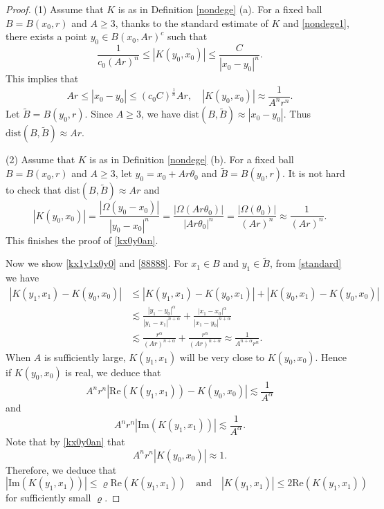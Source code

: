 \documentclass[oneside,english,a4wide]{amsart}
\numberwithin{equation}{section}
\numberwithin{figure}{section}
\theoremstyle{plain}
\theoremstyle{plain}
\theoremstyle{definition}
\theoremstyle{plain}
\theoremstyle{remark}
\theoremstyle{definition}
\theoremstyle{remark}
\theoremstyle{definition}
\newcommand{\8}{\infty}
\begin{document}
\begin{proof}
	(1) Assume that $K$ is as in Definition \ref{nondege} (a). For a fixed ball $B=B(x_0,r)$ and $A\ge 3$, thanks to the standard estimate of $K$ and \eqref{nondege1}, there exists a point $y_0\in B(x_0,Ar)^c$ such that
	\begin{equation*}
		\frac{1}{c_0(Ar)^n}\le |K(y_0,x_0)|\le \frac{C}{|x_0-y_0|^n}.
	\end{equation*}
	This implies that 
	\begin{equation*}
		Ar\le |x_0-y_0|\le (c_0C)^{\frac{1}{n}}Ar,\quad |K(y_0,x_0)|\approx \frac{1}{A^nr^n}.
	\end{equation*}
	Let $\tilde{B}=B(y_0,r)$. Since $A\ge 3$, we have $\mathrm{dist}(B,\tilde{B})\approx |x_0-y_0|$. Thus
	$\mathrm{dist}(B,\tilde{B})\approx Ar$.
	
	(2) Assume that $K$ is as in Definition \ref{nondege} (b). For a fixed ball $B=B(x_0,r)$ and $A\ge 3$, let $y_0=x_0+Ar\theta_0$ and $\tilde{B}=B(y_0,r)$. It is not hard to check that $\mathrm{dist}(B,\tilde{B})\approx Ar$ and
	\begin{equation*}
		|K(y_0,x_0)|=\frac{|\Omega(y_0-x_0)|}{|y_0-x_0|^n}=\frac{|\Omega(Ar\theta_0)|}{|Ar\theta_0|^n}=\frac{|\Omega(\theta_0)|}{(Ar)^n}\approx \frac{1}{(Ar)^n}.
	\end{equation*}
This finishes the proof of \eqref{kx0y0an}. 

Now we show \eqref{kx1y1x0y0} and \eqref{88888}. For $x_1\in B$ and $y_1\in \tilde{B}$, from \eqref{standard} we have  
	\begin{equation*}
		\begin{aligned}
			|K(y_1,x_1)-K(y_0,x_0)|{}&\le |K(y_1,x_1)-K(y_0,x_1)|+|K(y_0,x_1)-K(y_0,x_0)|     \\
			&\lesssim \frac{|y_1-y_0|^\alpha}{|y_1-x_1|^{n+\alpha}}+\frac{|x_1-x_0|^\alpha}{|x_1-y_0|^{n+\alpha}}\\
			&\lesssim \frac{r^{\alpha}}{(Ar)^{n+\alpha} }+\frac{r^{\alpha}}{(Ar)^{n+\alpha} }\approx \frac{1}{A^{n+\alpha}r^n}.
		\end{aligned}
	\end{equation*}
	When $A$ is sufficiently large, $K(y_1,x_1)$ will be very close to $K(y_0,x_0)$. Hence if $K(y_0,x_0)$ is real, we deduce that
	\begin{equation*}
		A^nr^n|\mathrm{Re}(K(y_1,x_1))-K(y_0,x_0)|\lesssim\frac{1}{A^{\alpha}}
	\end{equation*}
and
\begin{equation*}
	A^nr^n|\mathrm{Im}(K(y_1,x_1))|\lesssim\frac{1}{A^{\alpha}}.
\end{equation*}
Note that by \eqref{kx0y0an} that
\begin{equation*}
	A^nr^n|K(y_0,x_0)|\approx 1.
\end{equation*}	
Therefore, we deduce that
	\begin{equation*}
		|\mathrm{Im}(K(y_1,x_1))|\le \varrho\mathrm{Re}(K(y_1,x_1))
	\quad \text{and} \quad
		|K(y_1,x_1)|\le 2\mathrm{Re}(K(y_1,x_1))
	\end{equation*}
	for sufficiently small $\varrho$.
\end{proof}
\end{document}
